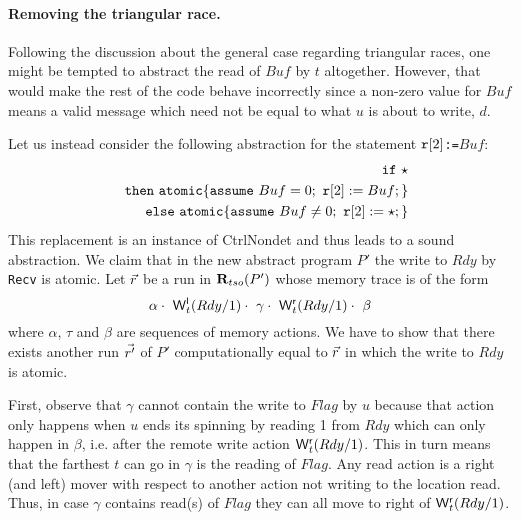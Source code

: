 \paragraph{Removing the triangular race.}
Following the discussion about the general case regarding triangular races, one might be tempted to abstract the read of $Buf$ by $t$ altogether.
However, that would make the rest of the code behave incorrectly since a non-zero value for $Buf$ means a valid message which need not be equal to what $u$ is about to write, $d$.

Let us instead consider the following abstraction for the statement {\tt $\mathtt{r}[2]$:=$Buf$}:
{\small
\begin{eqnarray*}
&&\mathtt{if}\ {\star}\\
&&\mathtt{then}\ \mathtt{atomic}\{\mathtt{assume}\ Buf=0;\ \mathtt{r}[2]:=Buf;\}\\
&&\mathtt{else}\ \mathtt{atomic}\{\mathtt{assume}\ Buf\neq0;\ \mathtt{r}[2]:=\star;\}
\end{eqnarray*}
}
This replacement is an instance of {\sc\small CtrlNondet} and thus leads to a sound abstraction.
We claim that in the new abstract program $P'$ the write to $Rdy$ by {\tt Recv} is atomic.
Let $\vec{r}$ be a run in $\mathbf{R}_{tso}(P')$ whose memory trace is of the form
{\small
\[
\alpha\cdot\ \mathsf{W}^{\mathsf{l}}_{t}(Rdy/1)\cdot\ \gamma\cdot\ \mathsf{W}^{\mathsf{r}}_{t}(Rdy/1)\cdot\ \beta
\]
}
where $\alpha$, $\tau$ and $\beta$ are sequences of memory actions.
We have to show that there exists another run $\vec{r'}$ of $P'$ computationally equal to $\vec{r}$  in which the write to $Rdy$ is atomic.

First, observe that $\gamma$ cannot contain the write to $Flag$ by $u$ because that action only happens when $u$ ends its spinning by reading 1 from $Rdy$ which can only happen in $\beta$, i.e. after the remote write action $\mathsf{W}^{\mathsf{r}}_{t}(Rdy/1)$.
This in turn means that the farthest $t$ can go in $\gamma$ is the reading of $Flag$.
Any read action is a right (and left) mover with respect to another action not writing to the location read.
Thus, in case $\gamma$ contains read(s) of $Flag$ they can all move to right of $\mathsf{W}^{\mathsf{r}}_{t}(Rdy/1)$.

